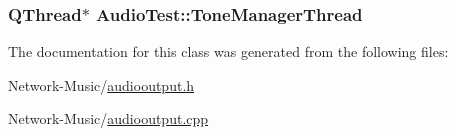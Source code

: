 \hypertarget{class_audio_test_a9c61f6a4dd4d0a6947d2a1a52d9df431}{
\subsubsection[{Tone\-Manager\-Thread}]{\setlength{\rightskip}{0pt plus 5cm}Q\-Thread$\ast$ Audio\-Test\-::\-Tone\-Manager\-Thread\hspace{0.3cm}{\ttfamily [protected]}}}\label{class_audio_test_a9c61f6a4dd4d0a6947d2a1a52d9df431}


The documentation for this class was generated from the following files\-:\begin{DoxyCompactItemize}
\item 
Network-\/\-Music/\hyperlink{audiooutput_8h}{audiooutput.\-h}\item 
Network-\/\-Music/\hyperlink{audiooutput_8cpp}{audiooutput.\-cpp}\end{DoxyCompactItemize}
